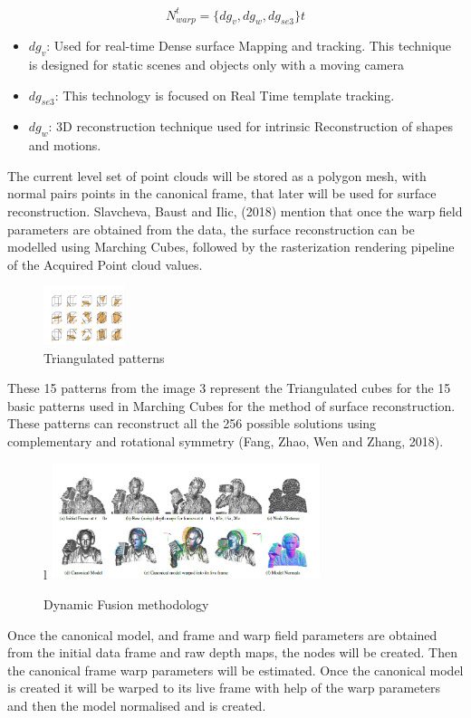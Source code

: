 \documentclass[a4paper]{thesis}
\begin{document}
\[N_{warp}^t=\{dg_v,dg_w,dg_{se3}\}t\]
\begin{itemize}[label =]
    \item $dg_{v}$: Used for real-time Dense surface Mapping and tracking. This technique is designed for static scenes and objects only with a moving camera
    \item $dg_{se3}$: This technology is focused on Real Time template tracking.
    \item $dg_{w}$: 3D reconstruction technique used for intrinsic Reconstruction of shapes and motions. 
\end{itemize}
The current level set of point clouds will be stored as a polygon mesh, with normal pairs points in the canonical frame, that later will be used for surface reconstruction.   
Slavcheva, Baust and Ilic, (2018)  mention that once the warp field parameters are obtained from the data, the surface reconstruction can be modelled using Marching Cubes, followed by the rasterization rendering pipeline of the Acquired Point cloud values.\\
\begin{figure} %
    \centering
    \includegraphics[width=0.21\textwidth]{shapes.png}
    \caption{Triangulated patterns \cite[]{fang_zhao_wen_zhang_2018}}
\end{figure}
These 15 patterns from the image 3 represent the Triangulated cubes for the 15 basic patterns used in Marching Cubes for the method of surface reconstruction. These patterns can reconstruct all the 256 possible solutions using complementary and rotational symmetry (Fang, Zhao, Wen and Zhang, 2018).
\begin{figure}{l} %
    \centering
    \includegraphics[width=0.7\textwidth]{dynamicfusion2.png}
    \caption{Dynamic Fusion methodology \cite[]{newcombe_fox_seitz_2015}}
\end{figure}
Once the canonical model, and frame and warp field parameters are obtained from the initial data frame and raw depth maps, the nodes will be created. Then the canonical frame warp parameters will be estimated. Once the canonical model is created it will be warped to its live frame with help of the warp parameters and then the model normalised and is created. \\
\enlargethispage{\baselineskip}
\end{document}
